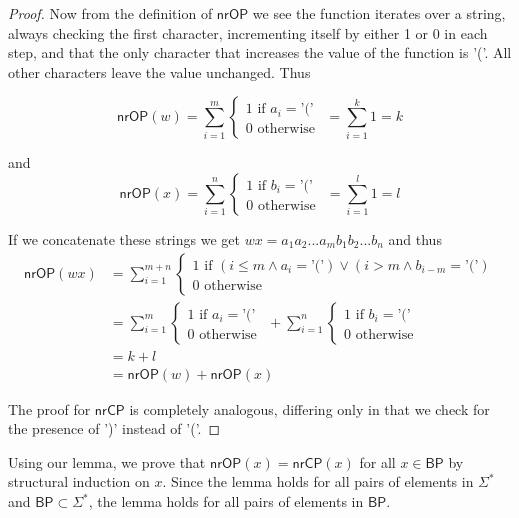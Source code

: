 \documentclass{article}
\begin{document}
\begin{enumerate}
\begin{proof}
                    Now from the definition of $\mathsf{nrOP}$ we see the function iterates over a string, always checking the first character, incrementing itself by either 1 or 0 in each step, and that the only character that increases the value of the function is '('. All other characters leave the value unchanged. Thus

            $$\mathsf{nrOP}(w) = \sum_{i = 1}^m \begin{cases} 1 \text{ if } a_i = \text{'('}\\ 0 \text{ otherwise } \end{cases} = \sum_{i = 1}^k 1 = k$$

            and 
            $$\mathsf{nrOP}(x) = \sum_{i = 1}^n \begin{cases} 1 \text{ if } b_i = \text{'('}\\ 0 \text{ otherwise } \end{cases} = \sum_{i = 1}^l 1 = l$$


            If we concatenate these strings we get $wx = a_1a_2...a_mb_1b_2...b_n$ and thus 
        \begin{align*}
            \mathsf{nrOP}(wx) &= \sum_{i = 1}^{m+n} \begin{cases} 1 \text{ if } (i \leq m \land a_i = \text{'('}) \lor (i > m \land b_{i-m} = \text{'('})\\ 0 \text{ otherwise } \end{cases}\\
                              & = \sum_{i = 1}^m  \begin{cases} 1 \text{ if } a_i = \text{'('}\\ 0 \text{ otherwise } \end{cases} +  \sum_{i = 1}^n \begin{cases} 1 \text{ if } b_i = \text{'('}\\ 0 \text{ otherwise } \end{cases}     \\
                              & = k + l\\
                              & = \mathsf{nrOP}(w) + \mathsf{nrOP}(x)
        \end{align*}

        The proof for $\mathsf{nrCP}$ is completely analogous, differing only in that we check for the presence of ')' instead of '('.

        \end{proof}
        Using our lemma, we prove that $\mathsf{nrOP}(x) = \mathsf{nrCP}(x)$ for all $x \in \mathsf{BP}$ by structural induction on $x$. Since the lemma holds for all pairs of elements in $\Sigma^*$ and $\mathsf{BP} \subset \Sigma^*$, the lemma holds for all pairs of elements in $\mathsf{BP}$.


\end{enumerate}
\end{document}
